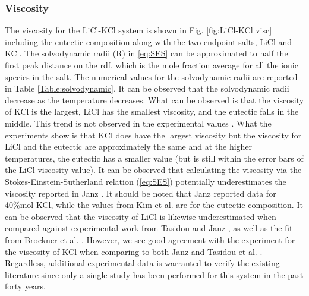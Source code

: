 \documentclass[review]{elsarticle}
\begin{document}
\subsubsection{Viscosity}
The viscosity for the LiCl-KCl system is shown in Fig. \ref{fig:LiCl-KCl visc} including the eutectic composition along with the two endpoint salts, LiCl and KCl. The solvodynamic radii (R) in \cref{eq:SES} can be approximated to half the first peak distance on the rdf, which is the mole fraction average for all the ionic species in the salt. The numerical values for the solvodynamic radii are reported in Table \ref{Table:solvodynamic}. It can be observed that the solvodynamic radii decrease as the temperature decreases. What can be observed is that the viscosity of KCl is the largest, LiCl has the smallest viscosity, and the eutectic falls in the middle. This trend is not observed in the experimental values \cite{janz_visc,janz_nist,janz_osti,kim2012high,brockner1975high,Tasidou}. What the experiments show is that KCl does have the largest viscosity but the viscosity for LiCl and the eutectic are approximately the same and at the higher temperatures, the eutectic has a smaller value (but is still within the error bars of the LiCl viscosity value). It can be observed that calculating the viscosity via the Stokes-Einstein-Sutherland relation (\cref{eq:SES}) potentially underestimates the viscosity reported in Janz \cite{janz_visc}. It should be noted that Janz reported data for 40\%mol KCl, while the values from Kim et al. \cite{kim2012high} are for the eutectic composition. It can be observed that the viscosity of LiCl is likewise underestimated when compared against experimental work from Tasidou \cite{tadano2014anharmonic} and Janz \cite{janz_nist,janz_osti}, as well as the fit from Brockner et al. \cite{brockner1975high}. However, we see good agreement with the experiment for the viscosity of KCl when comparing to both Janz \cite{janz_nist} and Tasidou et al. \cite{Tasidou}. Regardless, additional experimental data is warranted to verify the existing literature since only a single study has been performed for this system in the past forty years.
\end{document}
